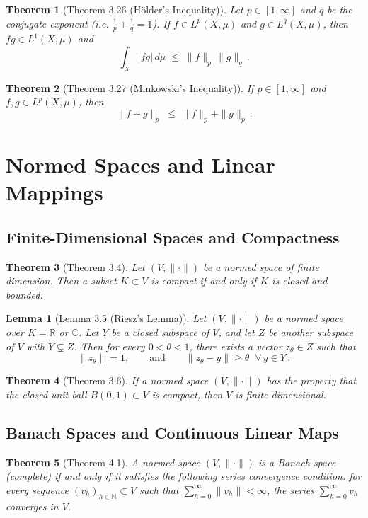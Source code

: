 \documentclass{article}
\theoremstyle{plain}
\newtheorem*{theorem*}{Theorem}
\newtheorem*{lemma*}{Lemma}
\begin{document}
\begin{theorem*}[Theorem 3.26 (Hölder’s Inequality)]
Let $p \in [1,\infty]$ and $q$ be the conjugate exponent (i.e. $\frac{1}{p}+\frac{1}{q}=1$). If $f \in L^p(X,\mu)$ and $g \in L^q(X,\mu)$, then $f g \in L^1(X,\mu)$ and 
\[
\int_X |f g|\,d\mu \;\le\; \|f\|_{p}\,\|g\|_{q}\,.
\]
\end{theorem*}

\begin{theorem*}[Theorem 3.27 (Minkowski’s Inequality)]
If $p \in [1,\infty]$ and $f, g \in L^p(X,\mu)$, then 
\[
\|f + g\|_{p} \;\le\; \|f\|_{p} + \|g\|_{p}\,.
\] 
\end{theorem*}

\section{Normed Spaces and Linear Mappings}

\subsection*{Finite-Dimensional Spaces and Compactness}
\begin{theorem*}[Theorem 3.4]
Let $(V,\|\cdot\|)$ be a normed space of \emph{finite dimension}. Then a subset $K \subset V$ is compact if and only if $K$ is closed and bounded.
\end{theorem*}

\begin{lemma*}[Lemma 3.5 (Riesz’s Lemma)]
Let $(V,\|\cdot\|)$ be a normed space over $K=\mathbb{R}$ or $\mathbb{C}$. Let $Y$ be a closed subspace of $V$, and let $Z$ be another subspace of $V$ with $Y \subsetneq Z$. Then for every $0<\theta<1$, there exists a vector $z_{\theta} \in Z$ such that 
\[
\|z_{\theta}\| = 1, \qquad \text{and} \qquad \|z_{\theta} - y\| \ge \theta \;\;\forall\,y \in Y\,.
\] 
\end{lemma*}

\begin{theorem*}[Theorem 3.6]
If a normed space $(V,\|\cdot\|)$ has the property that the closed unit ball $B(0,1) \subset V$ is compact, then $V$ is finite-dimensional.
\end{theorem*}

\subsection*{Banach Spaces and Continuous Linear Maps}
\begin{theorem*}[Theorem 4.1]
A normed space $(V,\|\cdot\|)$ is a Banach space (complete) if and only if it satisfies the following series convergence condition: for every sequence $(v_h)_{h\in\mathbb{N}} \subset V$ such that $\sum_{h=0}^\infty \|v_h\| < \infty$, the series $\sum_{h=0}^\infty v_h$ converges in $V$.
\end{theorem*}
\end{document}
